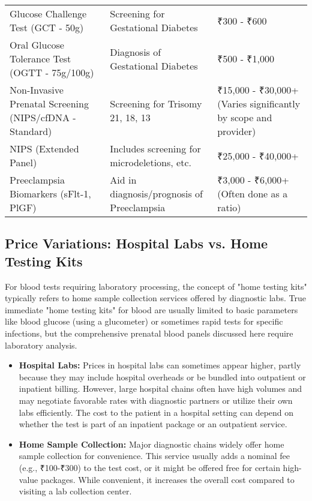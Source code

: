 \documentclass{article}
\begin{document}
\begin{longtable}{|p{4cm}|p{6cm}|p{5cm}|}
\addlinespace
Glucose Challenge Test (GCT - 50g) & Screening for Gestational Diabetes & ₹300 - ₹600 \\
\addlinespace
Oral Glucose Tolerance Test (OGTT - 75g/100g) & Diagnosis of Gestational Diabetes & ₹500 - ₹1,000 \\
\addlinespace
Non-Invasive Prenatal Screening (NIPS/cfDNA - Standard) & Screening for Trisomy 21, 18, 13 & ₹15,000 - ₹30,000+ (Varies significantly by scope and provider) \\
\addlinespace
NIPS (Extended Panel) & Includes screening for microdeletions, etc. & ₹25,000 - ₹40,000+ \\
\addlinespace
Preeclampsia Biomarkers (sFlt-1, PlGF) & Aid in diagnosis/prognosis of Preeclampsia & ₹3,000 - ₹6,000+ (Often done as a ratio) \\
\end{longtable}

\subsection{Price Variations: Hospital Labs vs. Home Testing Kits}
For blood tests requiring laboratory processing, the concept of "home testing kits" typically refers to home sample collection services offered by diagnostic labs. True immediate "home testing kits" for blood are usually limited to basic parameters like blood glucose (using a glucometer) or sometimes rapid tests for specific infections, but the comprehensive prenatal blood panels discussed here require laboratory analysis.

\begin{itemize}
    \item \textbf{Hospital Labs:} Prices in hospital labs can sometimes appear higher, partly because they may include hospital overheads or be bundled into outpatient or inpatient billing. However, large hospital chains often have high volumes and may negotiate favorable rates with diagnostic partners or utilize their own labs efficiently. The cost to the patient in a hospital setting can depend on whether the test is part of an inpatient package or an outpatient service.
    \item \textbf{Home Sample Collection:} Major diagnostic chains widely offer home sample collection for convenience. This service usually adds a nominal fee (e.g., ₹100-₹300) to the test cost, or it might be offered free for certain high-value packages. While convenient, it increases the overall cost compared to visiting a lab collection center.
\end{itemize}
\end{document}
